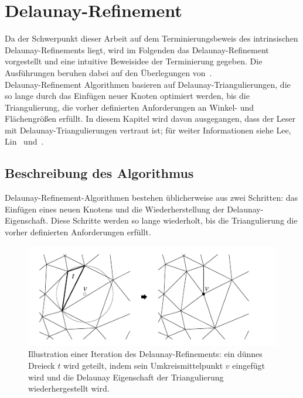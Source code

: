 \chapter{ Delaunay-Refinement }\label{kap:Algorithmus} Da der Schwerpunkt dieser Arbeit auf dem Terminierungsbeweis des intrinsischen Delaunay-Refinements liegt, wird im Folgenden das Delaunay-Refinement vorgestellt und eine intuitive Beweisidee der Terminierung gegeben. Die Ausführungen beruhen dabei auf den Überlegungen von~\citet{shewchuk:1997:delaunay,SHEWCHUK:2002:chuws}.\\
Delaunay-Refinement Algorithmen basieren auf Delaunay-Triangulierungen, die so lange durch das Einfügen neuer Knoten optimiert werden, bis die Triangulierung, die vorher definierten Anforderungen an Winkel- und Flächengrößen erfüllt. In diesem Kapitel wird davon ausgegangen, dass der Leser mit Delaunay-Triangulierungen vertraut ist; für weiter Informationen siehe Lee, Lin~\cite{lee:1986:DelaunayTriangulation} und~\citet{chew:1993:guaranteed}. 


\section*{Beschreibung des Algorithmus}

Delaunay-Refinement-Algorithmen bestehen üblicherweise aus zwei Schritten: das Einfügen eines neuen Knotens und die Wiederherstellung der Delaunay-Eigenschaft.
Diese Schritte  werden so lange wiederholt, bis die Triangulierung die vorher definierten Anforderungen erfüllt.\\ 


 \begin{figure}[h]
    \centering
    \includegraphics[width=5in]{images/delaunay_refinement.png}
    \caption{Illustration einer Iteration des Delaunay-Refinements: ein dünnes Dreieck $t$ wird geteilt, indem sein Umkreismittelpunkt $v$ eingefügt wird und die Delaunay Eigenschaft der Triangulierung wiederhergestellt wird. \cite{SHEWCHUK:2002:chuws} }
    \label{fig:delaunay_refinement}
\end{figure}



